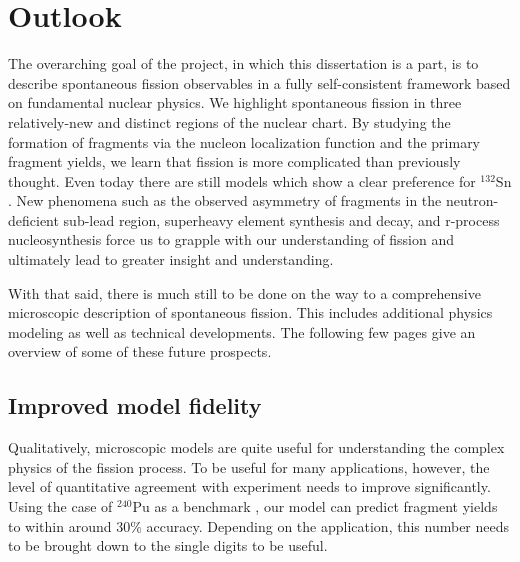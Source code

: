\chapter{Outlook}\label{chap:Outlook}

The overarching goal of the project, in which this dissertation is a part, is to describe spontaneous fission observables in a fully self-consistent framework based on fundamental nuclear physics. We highlight spontaneous fission in three relatively-new and distinct regions of the nuclear chart. By studying the formation of fragments via the nucleon localization function and the primary fragment yields, we learn that fission is more complicated than previously thought. Even today there are still models which show a clear preference for $^{132}$Sn \cite{Carjan2017}. New phenomena such as the observed asymmetry of fragments in the neutron-deficient sub-lead region, superheavy element synthesis and decay, and r-process nucleosynthesis force us to grapple with our understanding of fission and ultimately lead to greater insight and understanding.

With that said, there is much still to be done on the way to a comprehensive microscopic description of spontaneous fission. This includes additional physics modeling as well as technical developments. The following few pages give an overview of some of these future prospects.

\section{Improved model fidelity}
Qualitatively, microscopic models are quite useful for understanding the complex physics of the fission process. To be useful for many applications, however, the level of quantitative agreement with experiment needs to improve significantly. Using the case of $^{240}$Pu as a benchmark \cite{Sadhukhan2016}, our model can predict fragment yields to within around 30\% accuracy. Depending on the application, this number needs to be brought down to the single digits to be useful.

